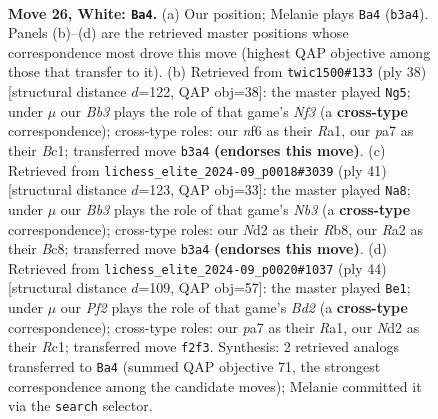 \documentclass[11pt]{article}
\begin{document}
\clearpage

\begin{figure}[p]\centering
\begin{subfigure}{0.46\textwidth}\centering
\resizebox{\linewidth}{!}{%
\newchessgame
\chessboard[
  setfen={rnb5/pp2qpbk/3rpnp1/P2p3p/3P3P/1B2B1P1/RPPNQP2/1N2R1K1 w - - 5 26},
  showmover=false,
  pgfstyle=straightmove, color=movearrow, markmove={b3-a4}
]}
\caption{}
\end{subfigure}\hfill
\begin{subfigure}{0.46\textwidth}\centering
\resizebox{\linewidth}{!}{%
\newchessgame
\chessboard[
  setfen={rn2rbk1/pbq2ppp/1p2n3/2p1PN2/2Pp4/PP1B1N1P/5PP1/R1BQR1K1 w - - 1 20},
  showmover=false,
  pgfstyle=straightmove, color=movearrow, markmove={f3-g5}
]}
\caption{}
\end{subfigure}
\\[4pt]
\begin{subfigure}{0.46\textwidth}\centering
\resizebox{\linewidth}{!}{%
\newchessgame
\chessboard[
  setfen={1rbqr1k1/1p1n1pbp/pn1p2p1/2pP4/P3PP2/2N2B1P/1PQN2PB/R4R1K b - - 2 21},
  showmover=false,
  pgfstyle=straightmove, color=movearrow, markmove={b6-a8}
]}
\caption{}
\end{subfigure}\hfill
\begin{subfigure}{0.46\textwidth}\centering
\resizebox{\linewidth}{!}{%
\newchessgame
\chessboard[
  setfen={r1rq1nk1/5pp1/1p2pn1p/p2p4/P1bP3P/2N1QPP1/1P1BP1B1/R1R3K1 w - - 1 23},
  showmover=false,
  pgfstyle=straightmove, color=movearrow, markmove={d2-e1}
]}
\caption{}
\end{subfigure}
\caption{\textbf{Move 26, White: \texttt{Ba4}.} (a) Our position; Melanie plays \texttt{Ba4} (\texttt{b3a4}). Panels (b)--(d) are the retrieved master positions whose correspondence most drove this move (highest QAP objective among those that transfer to it). (b) Retrieved from \texttt{twic1500\#133} (ply 38) [structural distance $d$=122, QAP obj=38]: the master played \texttt{Ng5}; under $\mu$ our \emph{Bb3} plays the role of that game's \emph{Nf3} (a \textbf{cross-type} correspondence); cross-type roles: our \emph{n}f6 as their \emph{R}a1, our \emph{p}a7 as their \emph{B}c1; transferred move \texttt{b3a4} \textbf{(endorses this move)}. (c) Retrieved from \texttt{lichess\_elite\_2024-09\_p0018\#3039} (ply 41) [structural distance $d$=123, QAP obj=33]: the master played \texttt{Na8}; under $\mu$ our \emph{Bb3} plays the role of that game's \emph{Nb3} (a \textbf{cross-type} correspondence); cross-type roles: our \emph{N}d2 as their \emph{R}b8, our \emph{R}a2 as their \emph{B}c8; transferred move \texttt{b3a4} \textbf{(endorses this move)}. (d) Retrieved from \texttt{lichess\_elite\_2024-09\_p0020\#1037} (ply 44) [structural distance $d$=109, QAP obj=57]: the master played \texttt{Be1}; under $\mu$ our \emph{Pf2} plays the role of that game's \emph{Bd2} (a \textbf{cross-type} correspondence); cross-type roles: our \emph{p}a7 as their \emph{R}a1, our \emph{N}d2 as their \emph{R}c1; transferred move \texttt{f2f3}. Synthesis: 2 retrieved analogs transferred to \texttt{Ba4} (summed QAP objective 71, the strongest correspondence among the candidate moves); Melanie committed it via the \texttt{search} selector.}
\label{fig:thought-m50}
\end{figure}
\end{document}
